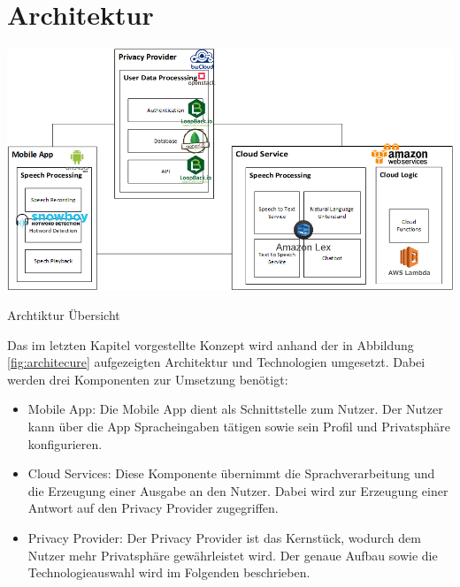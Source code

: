 \section{Architektur}\label{sec:architecure}

\captionsetup[table]{name=Abbildung}
\renewcommand\thetable{8}
\begin{table}[!ht]
	\centering
	\includegraphics[width=1\linewidth]{Picture/Architektur}
	\caption[Archtiktur Übersicht]{Archtiktur Übersicht}
	\label{fig:architecure}
\end{table}

Das im letzten Kapitel vorgestellte Konzept wird anhand der in Abbildung \ref{fig:architecure} aufgezeigten Architektur und Technologien umgesetzt. Dabei werden drei Komponenten zur Umsetzung benötigt:
 
\begin{itemize}
    \item Mobile App: Die Mobile App dient als Schnittstelle zum Nutzer. Der Nutzer kann über die App Spracheingaben tätigen sowie sein Profil und Privatsphäre konfigurieren.
    \item Cloud Services: Diese Komponente übernimmt die Sprachverarbeitung und die Erzeugung einer Ausgabe an den Nutzer. Dabei wird zur Erzeugung einer Antwort auf den Privacy Provider zugegriffen.
    \item Privacy Provider: Der Privacy Provider ist das Kernstück, wodurch dem Nutzer mehr Privatsphäre gewährleistet wird. Der genaue Aufbau sowie die Technologieauswahl wird im Folgenden beschrieben. 
\end{itemize}

